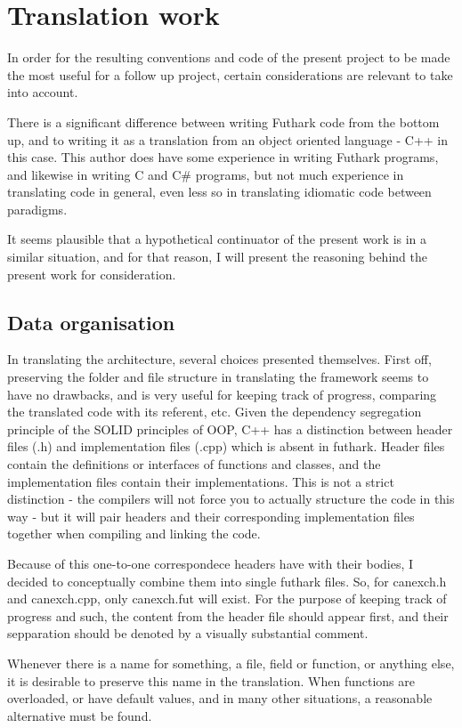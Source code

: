 \section{Translation work}
In order for the resulting conventions and code of the present project to be made the most useful for a follow up project, certain considerations are relevant to take into account.

There is a significant difference between writing Futhark code from the bottom up, and to writing it as a translation from an object oriented language - C++ in this case. This author does have some experience in writing Futhark programs, and likewise in writing C and C\# programs, but not much experience in translating code in general, even less so in translating idiomatic code between paradigms.

It seems plausible that a hypothetical continuator of the present work is in a similar situation, and for that reason, I will present the reasoning behind the present work for consideration.
\subsection{Data organisation}
In translating the architecture, several choices presented themselves. First off, preserving the folder and file structure in translating the framework seems to have no drawbacks, and is very useful for keeping track of progress, comparing the translated code with its referent, etc. Given the dependency segregation principle of the SOLID principles of OOP, C++ has a distinction between header files (.h) and implementation files (.cpp) which is absent in futhark. Header files contain the definitions or interfaces of functions and classes, and the implementation files contain their implementations. This is not a strict distinction - the compilers will not force you to actually structure the code in this way - but it will pair headers and their corresponding implementation files together when compiling and linking the code.

Because of this one-to-one correspondece headers have with their bodies, I decided to conceptually combine them into single futhark files. So, for canexch.h and canexch.cpp, only canexch.fut will exist. For the purpose of keeping track of progress and such, the content from the header file should appear first, and their sepparation should be denoted by a visually substantial comment.

Whenever there is a name for something, a file, field or function, or anything else, it is desirable to preserve this name in the translation. When functions are overloaded, or have default values, and in many other situations, a reasonable alternative must be found.

